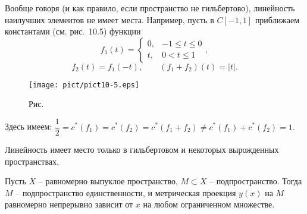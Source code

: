  \begin{Remark} %
 Вообще говоря (и как правило, если пространство не гильбертово), линейность наилучших
 элементов не имеет места. Например, пусть в $C[-1,1]$
 приближаем константами {(см. рис.~10.5)} функции
 $$
     {f_1(t)=\begin{cases}
     0, & -1 \le t \le 0 \\
     t, & 0 < t \le 1
   \end{cases},}
   $$
   $$
   f_2(t)=f_1(-t),
   \qquad (f_1+f_2)(t)=|t|.
 $$


 \bigskip
\begin{figure}[ht]
\begin{center}
\texttt{[image: pict/pict10-5.eps]}
\end{center}
 \bigskip
 \label{r10-5}

 \centerline{Рис.~\theris}
 \bigskip
\end{figure}

 \noindent Здесь имеем: $\dfrac12=c^*(f_1)=c^*(f_2)=c^*(f_1+f_2)\ne c^*(f_1)+
 c^*(f_2)=1.$

 Линейность имеет место только в гильбертовом
 и некоторых вырожденных пространствах.
 \end{Remark}

 \begin{teo} %
 Пусть $X$ -- равномерно выпуклое пространство, $M\subset X $ -- подпространство. Тогда $M$
 -- подпространство единственности, и метрическая проекция $y(x)$ {на $M$}
 равномерно непрерывно зависит от $x$ {на любом ограниченном} {множестве}.
 \end{teo}


